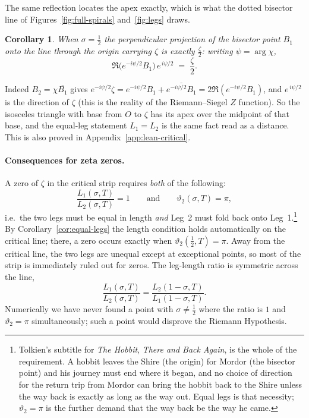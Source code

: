 \documentclass[11pt]{article}
\newtheorem{corollary}[theorem]{Corollary}
\theoremstyle{definition}
\begin{document}
The same reflection locates the apex exactly, which is what the dotted bisector
line of Figures~\ref{fig:full-spirals} and~\ref{fig:legs} draws.

\begin{corollary}\label{cor:bisector-proj}
When $\sigma=\tfrac12$ the perpendicular projection of the bisector point $B_1$
onto the line through the origin carrying $\zeta$ is exactly $\tfrac{\zeta}{2}$:
writing $\psi=\arg\chi$,
\begin{equation}\label{eq:bisector-proj}
\Re\!\bigl(e^{-i\psi/2}B_1\bigr)\,e^{\,i\psi/2}\;=\;\frac{\zeta}{2}.
\end{equation}
\end{corollary}

Indeed $B_2=\chi\overline{B_1}$ gives
$e^{-i\psi/2}\zeta=e^{-i\psi/2}B_1+\overline{e^{-i\psi/2}B_1}
=2\Re(e^{-i\psi/2}B_1)$, and $e^{\,i\psi/2}$ is the direction of $\zeta$ (this is
the reality of the Riemann--Siegel $Z$ function). So the isosceles triangle with
base from $O$ to $\zeta$ has its apex over the midpoint of that base, and the
equal-leg statement $L_1=L_2$ is the same fact read as a distance. This is also
proved in Appendix~\ref{app:lean-critical}.

\paragraph{Consequences for zeta zeros.} A zero of $\zeta$ in the critical strip
requires \emph{both} of the following:
\[
\frac{L_{1}(\sigma,T)}{L_{2}(\sigma,T)} = 1
\qquad\text{and}\qquad
\vartheta_2(\sigma,T) = \pi,
\]
i.e.\ the two legs must be equal in length \emph{and} Leg~2 must fold back onto
Leg~1.\footnote{Tolkien's subtitle for \emph{The Hobbit}, \emph{There and Back
Again}, is the whole of the requirement. A hobbit leaves the Shire (the origin)
for Mordor (the bisector point) and his journey must end where it began, and no
choice of direction for the return trip from Mordor can bring the hobbit back to
the Shire unless the way back is exactly as long as the way out. Equal legs is that necessity; $\vartheta_2=\pi$ is the further
demand that the way back be the way he came.} By Corollary~\ref{cor:equal-legs} the length condition holds automatically on
the critical line; there, a zero occurs exactly when $\vartheta_2(\tfrac12,T) =
\pi$. Away from the critical line, the two legs are unequal except at
exceptional points, so most of the strip is immediately ruled out for zeros. The leg-length ratio is symmetric across the
line,
\begin{equation}
\frac{L_{1}(\sigma,T)}{L_{2}(\sigma,T)}
=
\frac{L_{2}(1-\sigma,T)}{L_{1}(1-\sigma,T)} .
\end{equation}
Numerically we have never found a point with $\sigma\neq\tfrac12$ where the
ratio is $1$ and $\vartheta_2=\pi$ simultaneously; such a point would disprove
the Riemann Hypothesis.
\end{document}
